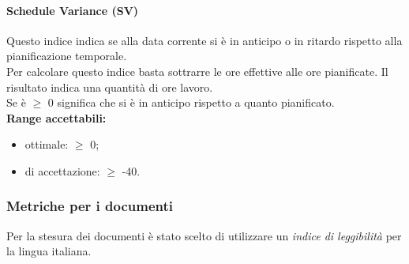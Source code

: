 \documentclass{scalatekids-article}
\begin{document}
\paragraph{Schedule Variance (SV)}
Questo indice indica se alla data corrente si è in anticipo o in ritardo rispetto alla pianificazione temporale.\\ Per calcolare questo indice basta sottrarre le ore effettive alle ore pianificate. Il risultato indica una quantità di ore lavoro.\\
Se  è $\geq$ 0 significa che si è in anticipo rispetto a quanto pianificato.\\
\textbf{Range accettabili:}
\begin{itemize}
  \item {} ottimale: $\geq$ 0;
  \item {} di accettazione: $\geq$ -40.
\end{itemize}

\subsubsection{Metriche per i documenti}
\label{sec:metricheDocumenti}
Per la stesura dei documenti è stato scelto di utilizzare un \textit{indice di leggibilità} per la lingua italiana.
\end{document}
